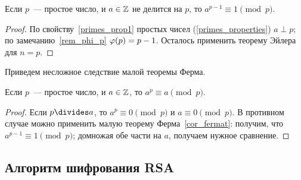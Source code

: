 \begin{corollary}\label{cor_fermat}
Если $p$~--- простое число, и $a\in\mathbb Z$ не делится на $p$,
то $a^{p-1}\equiv 1\pmod{p}$.
\end{corollary}
\begin{proof}
По свойству~\ref{primes_prop1} простых чисел (\ref{primes_properties})
$a\perp p$; по замечанию~\ref{rem_phi_p} $\varphi(p)=p-1$. Осталось
применить теорему Эйлера для $n=p$.
\end{proof}

Приведем несложное следствие малой теоремы Ферма.

\begin{corollary}\label{cor_fermat2}
Если $p$~--- простое число, и $a\in\mathbb Z$, то
$a^p\equiv a\pmod{p}$.
\end{corollary}
\begin{proof}
Если $p\divides a$, то $a^p\equiv 0\pmod{p}$ и $a\equiv
0\pmod{p}$. В противном случае можно применить малую теорему
Ферма~\ref{cor_fermat}: получим, что $a^{p-1}\equiv 1\pmod{p}$;
домножая обе части на $a$, получаем нужное сравнение.
\end{proof}

\subsection{Алгоритм шифрования RSA}

